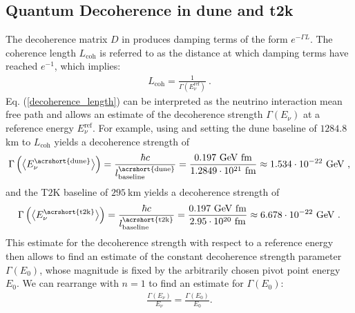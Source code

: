 \subsection{Quantum Decoherence in \texorpdfstring{\acrshort{dune}}{TEXT} and \texorpdfstring{\acrshort{t2k}}{TEXT}} \label{sec:qd_param_choices}
%
The decoherence matrix $D$ in  produces damping terms of the form $e^{-\Gamma L}$. The coherence length $L_\text{coh}$ is referred to as the distance at which damping terms have reached $e^{-1}$, which implies:
\vspace{-3mm}%
\begin{align} \label{decoherence_length}
   L_\text{coh} = \frac{1}{\Gamma(E^\text{ref}_\nu)} \ .
\end{align}
%
Eq. (\ref{decoherence_length}) can be interpreted as the neutrino interaction mean free path and allows an estimate of the decoherence strength $\Gamma(E_\nu)$ at a reference energy $E^\text{ref}_\nu$. For example, using  and setting the \acrshort{dune} baseline of $1284.8 \ $km to $L_\text{coh}$ yields a decoherence strength of
\vspace{-3mm}%
\begin{align} \label{decoherence_strength_dune}
   \Gamma\left(\bigl \langle E^\text{\acrshort{dune}}_\nu \bigr \rangle \right) = \frac{\hbar c}{l^\text{\acrshort{dune}}_\text{baseline}} = \frac{0.197 \ \text{GeV fm}}{1.2849 \cdot 10^{21} \ \text{fm}} \approx 1.534 \cdot 10^{-22} \ \text{GeV}  \ \text{,}
\end{align}
%
and the T$2$K baseline of $295 \ $km yields a decoherence strength of
\vspace{-3mm}%
\begin{align} \label{decoherence_strength_t2k}
   \Gamma\left(\bigl \langle E^\text{\acrshort{t2k}}_\nu \bigr \rangle \right) = \frac{\hbar c}{l^\text{\acrshort{t2k}}_\text{baseline}} = \frac{0.197 \ \text{GeV fm}}{2.95 \cdot 10^{20} \ \text{fm}} \approx 6.678 \cdot 10^{-22} \ \text{GeV}  \ .
\end{align}
%
This estimate for the decoherence strength with respect to a reference energy then allows to find an estimate of the constant decoherence strength parameter $\Gamma(E_0)$, whose magnitude is fixed by the arbitrarily chosen pivot point energy $E_0$. We can rearrange  with $n=1$ to find an estimate for $\Gamma(E_0)$:
\vspace{-3mm}%
%
\begin{align} \label{decoherence_strength_frac}
   \frac{\Gamma(E_\nu)}{E_\nu} = \frac{\Gamma(E_0)}{E_0} .
\end{align}
